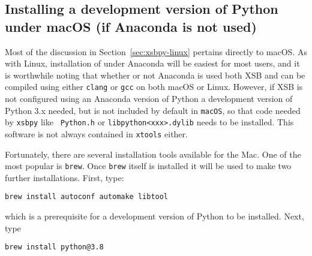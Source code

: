 
\noindent

\subsection{Installing a development version of Python under  macOS (if Anaconda is not used)}

Most of the discussion in Section~\ref{sec:xsbpy-linux} pertains
directly to macOS.  As with Linux, installation of \janus{} under
Anaconda will be easiest for most users, and it is worthwhile noting
that whether or not Anaconda is used both XSB and \janus{} can be
compiled using either {\tt clang} or {\tt gcc} on both macOS or Linux.
%
%
However, if XSB is not configured using an Anaconda version of Python
a development version of Python 3.x needed, but is not included by
default in {\tt macOS}, so that code needed by {\tt xsbpy} like {\tt
  Python.h} or {\tt libpython<xxx>.dylib} needs to be installed.  This
software is not always contained in {\tt xtools} either.

Fortunately, there are several installation tools available for the
Mac.  One of the most popular is {\tt brew}.  Once {\tt brew} itself
is installed it will be used to make two further installations.
First, type:

{\tt brew install autoconf automake libtool}

\noindent
which is a prerequisite for a development version of Python to be
installed.  Next, type 

{\tt brew install python@3.8}


